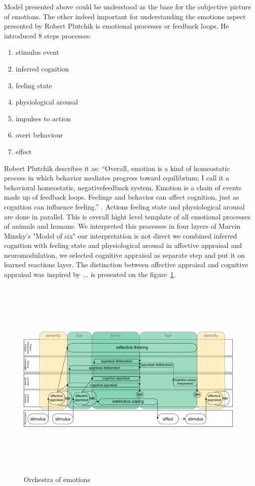 Model presented above could be understood as the base for the subjective picture of emotions. The other indeed important for understanding the emotions aspect presented by Robert Plutchik is emotional processes or feedback loops. He introduced 8 steps processes:

\begin{enumerate}
 \item{stimulus event}
 \item{inferred cognition}
 \item{feeling state}
 \item{physiological arousal}
 \item{impulses to action}
 \item{overt behaviour}
 \item{effect}
\end{enumerate}

Robert Plutchik describes it as: ``Overall, emotion is a kind of homeostatic process in which behavior mediates progress toward equilibrium; I call it a behavioral homeostatic, negativefeedback system. Emotion is a chain of events made up of feedback loops. Feelings and behavior can affect cognition, just as cognition can influence feeling.'' \cite{natureofemotions}. Actions feeling state and physiological arousal are done in parallel. This is overall hight level template of all emotional processes of animals and humans. We interpreted this processes in four layers of Marvin Minsky's "Model of six" our interpretation is not direct we combined inferred cognition with feeling state and physiological arousal in affective appraisal and neuromodulation, we selected cognitive appraisal as separate step and put it on learned reactions layer. The distinction between affective appraisal and cognitive appraisal was inspired by \cite{emotionsbraintorobot} ... 
is presented on the figure~\ref{orchestra_of_emotions}.

\begin{figure}
\begin{center}
 \includegraphics[height=10cm, angle=90]{figure2_orchestra_of_emotions}
\end{center}
\caption{Orchestra of emotions \label{orchestra_of_emotions}}
\end{figure}

